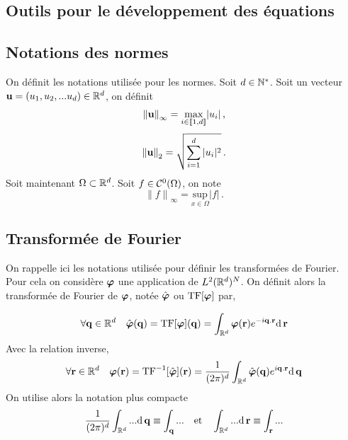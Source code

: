 \documentclass[10.5pt]{article}
\begin{document}
\pagebreak

\appendix


\begin{multicols}{2}
\section{Outils pour le développement des équations}

\label{ann:outils}


\subsection{Notations des normes}

On définit les notations utilisée pour les normes. Soit $d \in \mathbb{N}^*$. Soit un vecteur  ${\bf u} =(u_1, u_2, ... u_d) \in \mathbb{R}^d$, on définit
\begin{equation}
{\| {\bf u}\|}_\infty =  \underset{i \in  \llbracket 1,d \rrbracket }{\text{max}}{|u_i|}\, ,
\end{equation} 
\begin{equation}
{\| {\bf u}\|}_2 =  \sqrt{\sum_{i = 1}^{d} |u_i|^2} \, .
\end{equation}
Soit maintenant $\Omega \subset \mathbb{R}^d$. Soit $f \in \mathcal{C}^0(\Omega)$, on note
\begin{equation}
{\| f \|}_\infty =  \underset{x \in \Omega}{\text{sup}}{|f|} \, .
\end{equation} 



\subsection{Transformée de Fourier}

On rappelle ici les notations utilisée pour définir les transformées de Fourier. Pour cela on considère $\boldsymbol{ \varphi}$ une application de $L^2(\mathbb{R}^d)^N$. On définit alors la transformée de Fourier de $\boldsymbol{ \varphi}$, notée $\hat{\boldsymbol{ \varphi}}$ ou $\text{TF}[\boldsymbol{ \varphi}]$ par, 

\begin{equation}
  \forall {\bf q} \in \mathbb{R}^d \quad \hat{\boldsymbol{ \varphi}}({\bf q}) = \text{TF}[\boldsymbol{ \varphi}]({\bf q}) = \int_{\mathbb{R}^d} \boldsymbol{ \varphi}({\bf r}) e^{-i{\bf q}.{\bf r}}\text{d} \,{\bf r}
\end{equation}
Avec la relation inverse,
\begin{equation}
  \forall {\bf r} \in \mathbb{R}^d \quad \boldsymbol{ \varphi}({\bf r})  = \text{TF}^{-1}[\hat{\boldsymbol{ \varphi}}]({\bf r}) = \frac{1}{(2\pi)^d}\int_{\mathbb{R}^d} \hat{\boldsymbol{ \varphi}}({\bf q}) e^{i{\bf q}.{\bf r}}\text{d} \,{\bf q}
\end{equation}
On utilise alors la notation plus compacte 
\begin{equation}
  \frac{1}{(2\pi)^d}\int_{\mathbb{R}^d} ... \text{d} \,{\bf q} \equiv \int_{\bf q} ... \quad \text{et} \quad  \int_{\mathbb{R}^d} ... \text{d} \,{\bf r} \equiv \int_{\bf r} ... 
\end{equation}


\end{multicols}
\end{document}

